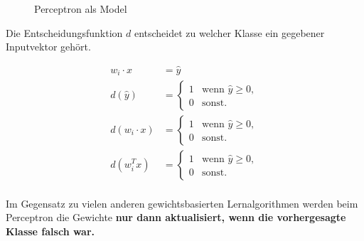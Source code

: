 \begin{flushleft}
\begin{figure}[H]
\caption{Perceptron als Model}
\end{figure}


Die Entscheidungsfunktion $d$ entscheidet zu welcher Klasse ein gegebener Inputvektor gehört.

\begin{align*}
w_{i}\cdot x &= \hat{y} \\
d(\hat{y}) &= \begin{cases}
       		1 & \text{wenn } \hat{y} \geq 0, \\
       		0 & \text{sonst.}
    	\end{cases} \\
d(w_{i} \cdot x) &= \begin{cases}
       		1 & \text{wenn } \hat{y} \geq 0, \\
       		0 & \text{sonst.}
    	\end{cases} \\
d(w_{i}^{T}x) &= \begin{cases}
       		1 & \text{wenn } \hat{y} \geq 0, \\
       		0 & \text{sonst.}
    	\end{cases} \\
\end{align*}


Im Gegensatz zu vielen anderen gewichtsbasierten Lernalgorithmen werden beim Perceptron die Gewichte \textbf{nur dann aktualisiert, wenn die vorhergesagte Klasse falsch war.}


\end{flushleft}
